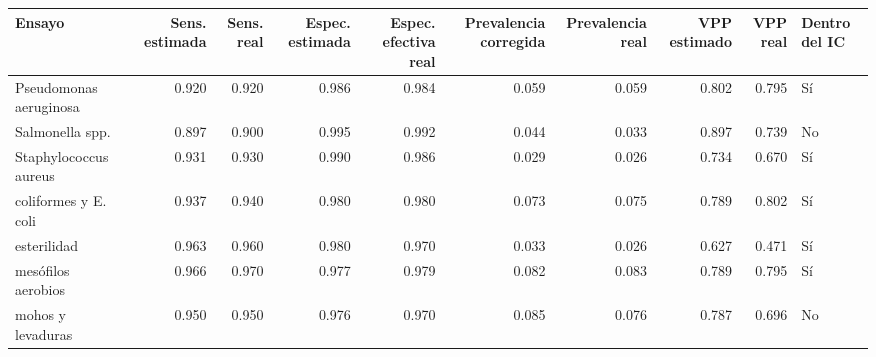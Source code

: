\begin{tabular}{lrrrrrrrrl}
\toprule
Ensayo & Sens. estimada & Sens. real & Espec. estimada & Espec. efectiva real & Prevalencia corregida & Prevalencia real & VPP estimado & VPP real & Dentro del IC \\
\midrule
Pseudomonas aeruginosa & 0.920 & 0.920 & 0.986 & 0.984 & 0.059 & 0.059 & 0.802 & 0.795 & Sí \\
Salmonella spp. & 0.897 & 0.900 & 0.995 & 0.992 & 0.044 & 0.033 & 0.897 & 0.739 & No \\
Staphylococcus aureus & 0.931 & 0.930 & 0.990 & 0.986 & 0.029 & 0.026 & 0.734 & 0.670 & Sí \\
coliformes y E. coli & 0.937 & 0.940 & 0.980 & 0.980 & 0.073 & 0.075 & 0.789 & 0.802 & Sí \\
esterilidad & 0.963 & 0.960 & 0.980 & 0.970 & 0.033 & 0.026 & 0.627 & 0.471 & Sí \\
mesófilos aerobios & 0.966 & 0.970 & 0.977 & 0.979 & 0.082 & 0.083 & 0.789 & 0.795 & Sí \\
mohos y levaduras & 0.950 & 0.950 & 0.976 & 0.970 & 0.085 & 0.076 & 0.787 & 0.696 & No \\
\bottomrule
\end{tabular}
